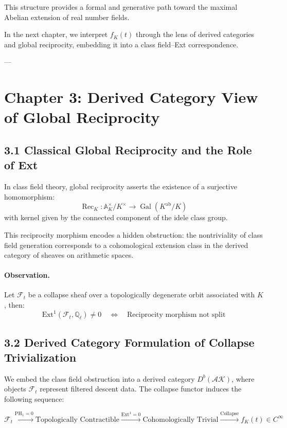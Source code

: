 \documentclass[11pt]{article}
\begin{document}
This structure provides a formal and generative path toward the maximal Abelian extension of real number fields.

In the next chapter, we interpret \( f_K(t) \) through the lens of derived categories and global reciprocity, embedding it into a class field–Ext correspondence.


---


\section*{Chapter 3: Derived Category View of Global Reciprocity}

\subsection*{3.1 Classical Global Reciprocity and the Role of Ext}

In class field theory, global reciprocity asserts the existence of a surjective homomorphism:
\[
\operatorname{Rec}_K : \mathbb{A}_K^\times / K^\times \longrightarrow \operatorname{Gal}(K^{\mathrm{ab}} / K)
\]
with kernel given by the connected component of the idele class group.

This reciprocity morphism encodes a hidden obstruction: the nontriviality of class field generation corresponds to a cohomological extension class in the derived category of sheaves on arithmetic spaces.

\paragraph{Observation.}  
Let \( \mathcal{F}_t \) be a collapse sheaf over a topologically degenerate orbit associated with \( K \), then:
\[
\mathrm{Ext}^1(\mathcal{F}_t, \mathbb{Q}_\ell) \neq 0 \quad \Longleftrightarrow \quad \text{Reciprocity morphism not split}
\]

\subsection*{3.2 Derived Category Formulation of Collapse Trivialization}

We embed the class field obstruction into a derived category \( D^b(\mathcal{AK}) \), where objects \( \mathcal{F}_t \) represent filtered descent data. The collapse functor induces the following sequence:

\[
\mathcal{F}_t \xrightarrow{\text{PH}_1 = 0} \text{Topologically Contractible} \xrightarrow{\text{Ext}^1 = 0} \text{Cohomologically Trivial} \xrightarrow{\text{Collapse}} f_K(t) \in C^\infty
\]
\end{document}
